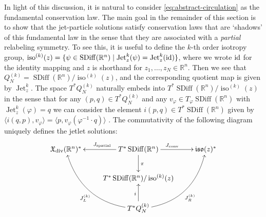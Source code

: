 \documentclass[12pt]{amsart}
\newcommand{\R}{\ensuremath{\mathbb{R}}}
\DeclareMathOperator{\SDiff}{SDiff}
\DeclareMathOperator{\Jet}{Jet}
\DeclareMathOperator{\iso}{iso}
\begin{document}
In light of this discussion, it is natural to consider \eqref{eq:abstract-circulation} as the  fundamental conservation law. The main goal in the remainder of this section is to show that the jet-particle solutions satisfy conservation laws that are `shadows' of this fundamental law in the sense that they are associated with a \emph{partial} relabeling symmetry. To see this, it is useful to define the $k$-th order isotropy group,
$\iso^{(k)}(z) = \{ \psi \in \SDiff(\R^n) \mid \Jet^{k}_z( \psi) = \Jet^k_z (\rm{id}) \}$, where we wrote $\rm{id}$ for the identity mapping and $z$ is shorthand for $z_1, \ldots, z_N \in \mathbb{R}^n$.
Then we see that $Q^{(k)}_N = \SDiff(\R^n) / \iso^{(k)}(z)$, and the corresponding quotient map is given by $\Jet_z^k$.  
 The space $T^*Q^{(k)}_N$ naturally embeds into $T^*\SDiff(\R^n) / \iso^{(k)}(z)$ in the sense that
 for any $(p,q) \in T^*Q^{(k)}_N$ and any $v_\varphi \in T_\varphi \SDiff(\mathbb{R}^n)$ with $\Jet_z^k(\varphi) = q$ we can
 consider the element $i(p,q) \in T^*\SDiff(\R^n)$ given by $\langle i(q,p) , v_\varphi \rangle = \langle p , v_\varphi( \varphi^{-1} \cdot q) \rangle$
 \cite[(2.2.4)]{HRS}.
 The commutativity of the following diagram uniquely defines the jetlet solutions:
\begin{displaymath}
\xymatrix{
\mathfrak{X}_{\rm div}(\R^n)^* & \ar[l]_{J_{\rm spatial}} T^*\SDiff(\R^n) \ar[d]^{\pi} \ar[r]^{J_{\rm conv}} &  \mathfrak{iso}(z)^* \\
& T^*\SDiff(\R^n) / \iso^{(k)}(z) & \\
& T^*Q^{(k)}_N \ar[u]^i \ar@/_2pc/[uur]_{J_R^{(k)}} \ar@/^2pc/[uul]^{J_L^{(k)}} &
}
\end{displaymath}
\end{document}
